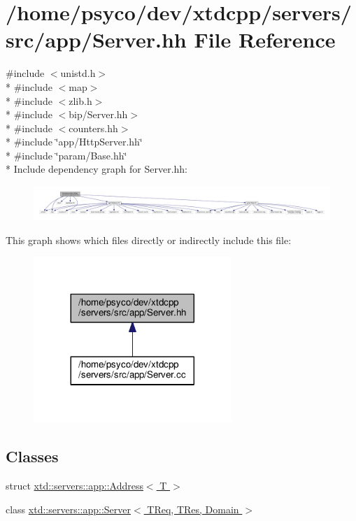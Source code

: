 \hypertarget{Server_8hh}{}\section{/home/psyco/dev/xtdcpp/servers/src/app/\+Server.hh File Reference}
\label{Server_8hh}
{\ttfamily \#include $<$unistd.\+h$>$}\\*
{\ttfamily \#include $<$map$>$}\\*
{\ttfamily \#include $<$zlib.\+h$>$}\\*
{\ttfamily \#include $<$bip/\+Server.\+hh$>$}\\*
{\ttfamily \#include $<$counters.\+hh$>$}\\*
{\ttfamily \#include \char`\"{}app/\+Http\+Server.\+hh\char`\"{}}\\*
{\ttfamily \#include \char`\"{}param/\+Base.\+hh\char`\"{}}\\*
Include dependency graph for Server.\+hh\+:
\nopagebreak
\begin{figure}[H]
\begin{center}
\leavevmode
\includegraphics[width=350pt]{Server_8hh__incl}
\end{center}
\end{figure}
This graph shows which files directly or indirectly include this file\+:
\nopagebreak
\begin{figure}[H]
\begin{center}
\leavevmode
\includegraphics[width=212pt]{Server_8hh__dep__incl}
\end{center}
\end{figure}
\subsection*{Classes}
\begin{DoxyCompactItemize}
\item 
struct \hyperlink{structxtd_1_1servers_1_1app_1_1Address}{xtd\+::servers\+::app\+::\+Address$<$ T $>$}
\item 
class \hyperlink{classxtd_1_1servers_1_1app_1_1Server}{xtd\+::servers\+::app\+::\+Server$<$ T\+Req, T\+Res, Domain $>$}
\end{DoxyCompactItemize}
